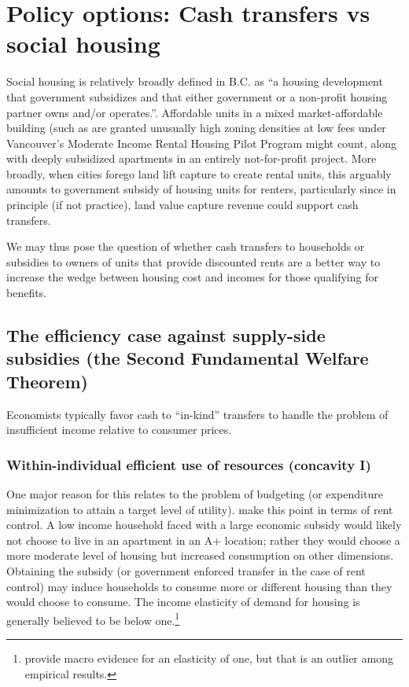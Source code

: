 \documentclass[12pt]{article}
\begin{document}
\section{Policy options: Cash transfers vs social housing}

Social housing is relatively broadly defined in B.C. as ``a housing development that government subsidizes and that either government or a non-profit housing partner owns and/or operates.''. Affordable units in a mixed market-affordable building (such as are granted unusually high zoning densities at low fees under Vancouver's Moderate Income Rental Housing Pilot Program might count, along with deeply subsidized apartments in an entirely not-for-profit project. More broadly, when cities forego land lift capture to create rental units, this arguably amounts to government subsidy of housing units for renters, particularly since in principle (if not practice), land value capture revenue could support cash transfers. 

We may thus pose the question of whether cash transfers to households or subsidies to owners of units that provide discounted rents are a better way to increase the wedge between housing cost and incomes for those qualifying for benefits.

\subsection{The efficiency case against supply-side subsidies (the Second Fundamental Welfare Theorem)}

Economists typically favor cash to ``in-kind'' transfers to handle the problem of insufficient income relative to consumer prices. 


\subsubsection{Within-individual efficient use of resources (concavity I)}

One major reason for this relates to the problem of budgeting (or expenditure minimization to attain a target level of utility). \textcite{GlaeserLuttmer} make this point in terms of rent control. A low income household faced with a large economic subsidy would likely not choose to live in an apartment in an A+ location; rather they would choose a more moderate level of housing but increased consumption on other dimensions. Obtaining the subsidy (or government enforced transfer in the case of rent control) may induce households to consume more or different housing than they would choose to consume. The income elasticity of demand for housing is generally believed to be below one.\footnote{\textcite{DavisFOM} provide macro evidence for an elasticity of one, but that is an outlier among empirical results.} 
\end{document}
